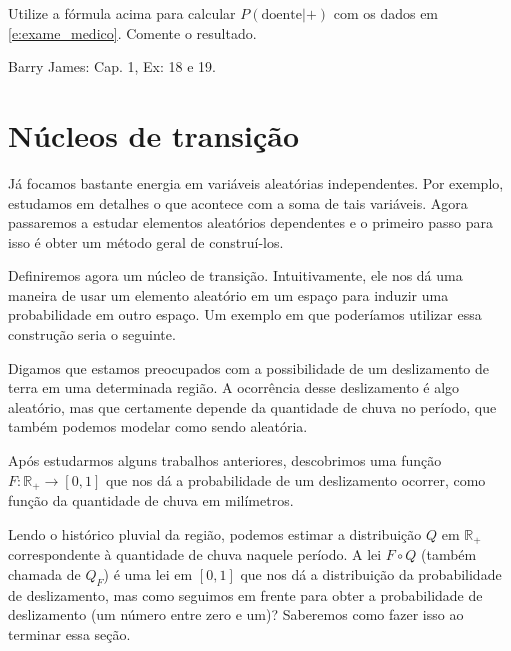 \begin{exercise}
  Utilize a fórmula acima para calcular $P(\text{doente} | +)$ com os dados em \eqref{e:exame_medico}.
  Comente o resultado.
\end{exercise}

\begin{exercise}
  Barry James: Cap. 1, Ex: 18 e 19.
\end{exercise}



\section{Núcleos de transição}

Já focamos bastante energia em variáveis aleatórias independentes.
Por exemplo, estudamos em detalhes o que acontece com a soma de tais variáveis.
Agora passaremos a estudar elementos aleatórios dependentes e o primeiro passo para isso é obter um método geral de construí-los.

Definiremos agora um núcleo de transição.
Intuitivamente, ele nos dá uma maneira de usar um elemento aleatório em um espaço para induzir uma probabilidade em outro espaço.
Um exemplo em que poderíamos utilizar essa construção seria o seguinte.

Digamos que estamos preocupados com a possibilidade de um deslizamento de terra em uma determinada região.
A ocorrência desse deslizamento é algo aleatório, mas que certamente depende da quantidade de chuva no período, que também podemos modelar como sendo aleatória.

Após estudarmos alguns trabalhos anteriores, descobrimos uma função $F:\mathbb{R}_+ \to [0,1]$ que nos dá a probabilidade de um deslizamento ocorrer, como função da quantidade de chuva em milímetros.

Lendo o histórico pluvial da região, podemos estimar a distribuição $Q$ em $\mathbb{R}_+$ correspondente à quantidade de chuva naquele período.
A lei $F \circ Q$ (também chamada de $Q_F$) é uma lei em $[0,1]$ que nos dá a distribuição da probabilidade de deslizamento, mas como seguimos em frente para obter a probabilidade de deslizamento (um número entre zero e um)?
Saberemos como fazer isso ao terminar essa seção.

